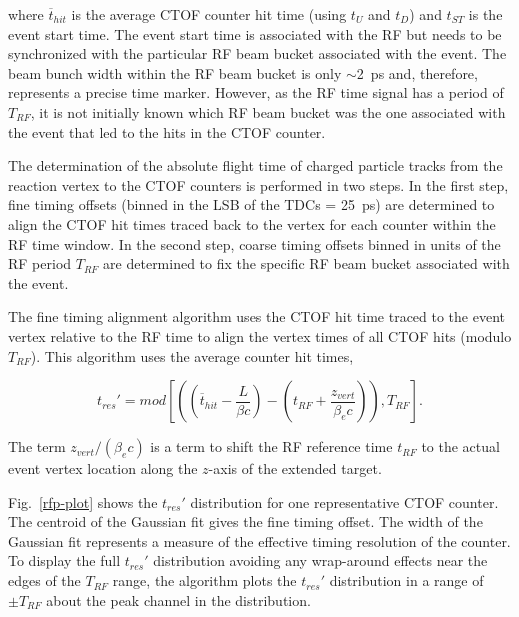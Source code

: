 \documentclass{elsart}
\begin{document}
\noindent
where $\overline{t}_{hit}$ is the average CTOF counter hit time (using $t_U$ and $t_D$) and $t_{ST}$
is the event start time. The event start time is associated with the RF but needs to be synchronized
with the particular RF beam bucket associated with the event. The beam bunch width within the RF beam
bucket is only $\sim$2~ps and, therefore, represents a precise time marker. However, as the RF time
signal has a period of $T_{RF}$, it is not initially known which RF beam bucket was the one associated with
the event that led to the hits in the CTOF counter.

The determination of the absolute flight time of charged particle tracks from the reaction vertex
to the CTOF counters is performed in two steps. In the first step, fine timing offsets (binned in the
LSB of the TDCs = 25~ps) are determined to align the CTOF hit times traced back to the vertex for
each counter within the RF time window. In the second step, coarse timing offsets binned in units of the
RF period $T_{RF}$ are determined to fix the specific RF beam bucket associated with the event.

The fine timing alignment algorithm uses the CTOF hit time traced to the event vertex relative to the
RF time to align the vertex times of all CTOF hits (modulo $T_{RF}$). This algorithm uses the average
counter hit times, 

\begin{equation}
t_{res}' = mod \left[ \left( \left(\overline{t}_{hit} - \frac{L}{\beta c} \right) -
\left(t_{RF} + \frac{z_{vert}}{\beta_e c} \right) \right), T_{RF} \right].
\end{equation}

\noindent
The term $z_{vert}/(\beta_e c)$ is a term to shift the RF reference time $t_{RF}$ to the actual event
vertex location along the $z$-axis of the extended target.

Fig.~\ref{rfp-plot} shows the $t_{res}'$ distribution for one representative CTOF counter. The
centroid of the Gaussian fit gives the fine timing offset. The width of the Gaussian fit represents
a measure of the effective timing resolution of the counter. To display the full $t_{res}'$ distribution
avoiding any wrap-around effects near the edges of the $T_{RF}$ range, the algorithm plots the
$t_{res}'$ distribution in a range of $\pm T_{RF}$ about the peak channel in the distribution.
\end{document}
